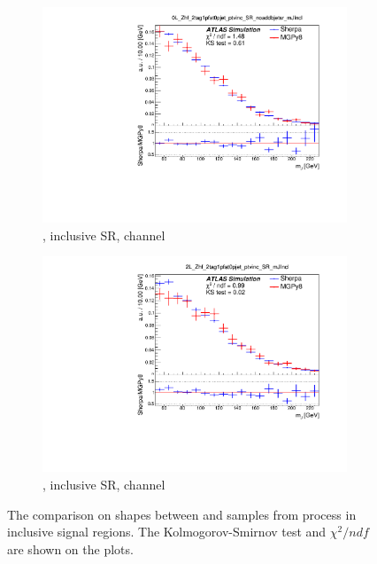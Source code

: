 \begin{figure}[!htbp]
\begin{subfigure}{.5\textwidth}
    \includegraphics[width=\textwidth]{chapters/6.vhbb_boosted/figs/0L_Zhf_2tag1pfat0pjet_ptvinc_SR_noaddbjetsr_mJIncl.pdf}
    \caption{\Zhf, \pTV inclusive SR, \zlep channel}
    \label{fig:Vjets_MGSherpa_inc_sub3}
  \end{subfigure}%
  \hfill
  \begin{subfigure}{.5\textwidth}
    \includegraphics[width=\textwidth]{chapters/6.vhbb_boosted/figs/2L_Zhf_2tag1pfat0pjet_ptvinc_SR_mJIncl.pdf}
    \caption{\Zhf, \pTV inclusive SR, \tlep channel}
    \label{fig:Vjets_MGSherpa_inc_sub4}
  \end{subfigure}%
  \hfill
  \caption{The comparison on \mJ shapes between \SHERPA and \MADGRAPH samples
  from \Vhf process in \pTV inclusive signal regions.
  The Kolmogorov-Smirnov test and $\chi^2/ndf$ are shown on the plots.}
  \label{fig:Vjets_MGSherpa_inc}
\end{figure}



